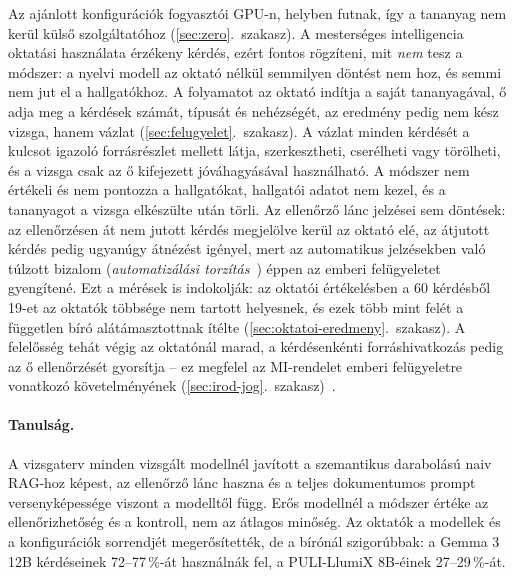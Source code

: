 Az ajánlott konfigurációk fogyasztói GPU-n, helyben futnak, így a tananyag nem kerül külső szolgáltatóhoz
(\ref{sec:zero}.~szakasz). A mesterséges intelligencia oktatási használata érzékeny kérdés, ezért fontos
rögzíteni, mit \emph{nem} tesz a módszer: a nyelvi modell az oktató nélkül semmilyen döntést nem hoz, és
semmi nem jut el a hallgatókhoz. A folyamatot az oktató indítja a saját tananyagával, ő adja meg a kérdések
számát, típusát és nehézségét, az eredmény pedig nem kész vizsga, hanem vázlat
(\ref{sec:felugyelet}.~szakasz). A vázlat minden kérdését a kulcsot igazoló forrásrészlet mellett látja,
szerkesztheti, cserélheti vagy törölheti, és a vizsga csak az ő kifejezett jóváhagyásával használható. A
módszer nem értékeli és nem pontozza a hallgatókat, hallgatói adatot nem kezel, és a tananyagot a vizsga
elkészülte után törli. Az ellenőrző lánc jelzései sem döntések: az ellenőrzésen át nem jutott kérdés
megjelölve kerül az oktató elé, az átjutott kérdés pedig ugyanúgy átnézést igényel, mert az automatikus
jelzésekben való túlzott bizalom (\emph{automatizálási torzítás}~\cite{parasuraman2010complacency}) éppen az
emberi felügyeletet gyengítené. Ezt a mérések is indokolják: az oktatói értékelésben a 60 kérdésből 19-et az
oktatók többsége nem tartott helyesnek, és ezek több mint felét a független bíró alátámasztottnak ítélte
(\ref{sec:oktatoi-eredmeny}.~szakasz). A felelősség tehát végig az oktatónál marad, a kérdésenkénti
forráshivatkozás pedig az ő ellenőrzését gyorsítja -- ez megfelel az MI-rendelet emberi felügyeletre vonatkozó
követelményének (\ref{sec:irod-jog}.~szakasz)~\cite{aiact2024}.

\paragraph{Tanulság.} A vizsgaterv minden vizsgált modellnél javított a szemantikus darabolású naiv RAG-hoz
képest, az ellenőrző lánc haszna és a teljes dokumentumos prompt versenyképessége viszont a modelltől függ.
Erős modellnél a módszer értéke az ellenőrizhetőség és a kontroll, nem az átlagos minőség. Az oktatók a
modellek és a konfigurációk sorrendjét megerősítették, de a bírónál szigorúbbak: a Gemma 3 12B kérdéseinek
72--77\,\%-át használnák fel, a PULI-LlumiX 8B-éinek 27--29\,\%-át.
